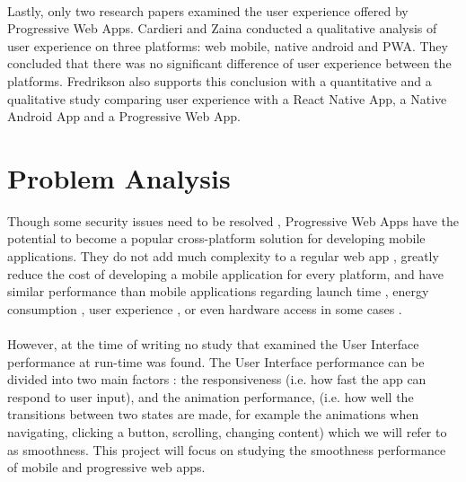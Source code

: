 \documentclass{kththesis}
\begin{document}
\paragraph{}
Lastly, only two research papers examined the user experience offered by Progressive Web Apps. Cardieri and Zaina \cite{PWA_UX_comparison_study} conducted a qualitative analysis of user experience on three platforms: web mobile, native android and PWA. They concluded that there was no significant difference of user experience between the platforms. Fredrikson \cite{emulating_native_w_crossplatform} also supports this conclusion with a quantitative and a qualitative study comparing user experience with a React Native App, a Native Android App and a Progressive Web App. 
\fi


\section{Problem Analysis}


Though some security issues need to be resolved \cite{Pride_Prejudice}, Progressive Web Apps have the potential to become a popular cross-platform solution for developing mobile applications. They do not add much complexity to a regular web app \cite{JohannsenFabian2018PWAa}, greatly reduce the cost of developing a mobile application for every platform, and have similar performance than mobile applications regarding launch time \cite{PWApossibleUnifer}\cite{Biorn-Hansen2} \cite{PWAapplicability}, energy consumption \cite{PWAapplicability}, user experience \cite{emulating_native_w_crossplatform}\cite{PWA_UX_comparison_study}, or even hardware access in some cases \cite{PWAbc_responsetime}. 
\paragraph{}

However, at the time of writing no study that examined the User Interface performance at run-time was found. The User Interface performance can be divided into two main factors : the responsiveness (i.e. how fast the app can respond to user input), and the animation performance, (i.e. how well the transitions between two states are made, for example the animations when navigating, clicking a button, scrolling, changing content) which we will refer to as smoothness. This project will focus on studying the smoothness performance of mobile and progressive web apps.
\end{document}

